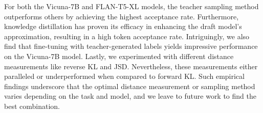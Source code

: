 For both the Vicuna-7B and FLAN-T5-XL models, the teacher sampling method outperforms others by achieving the highest acceptance rate. 
Furthermore, knowledge distillation has proven its efficacy in enhancing the draft model's approximation, resulting in a high token acceptance rate. Intriguingly, we also find that fine-tuning with teacher-generated labels yields impressive performance on the Vicuna-7B model. 
Lastly, we experimented with different distance measurements like reverse KL and JSD. %
Nevertheless, these measurements 
either paralleled or underperformed when compared to forward KL. 
Such empirical findings underscore that the optimal distance measurement or 
sampling method varies depending on the task and model, and we leave to future work to find the best combination. 


